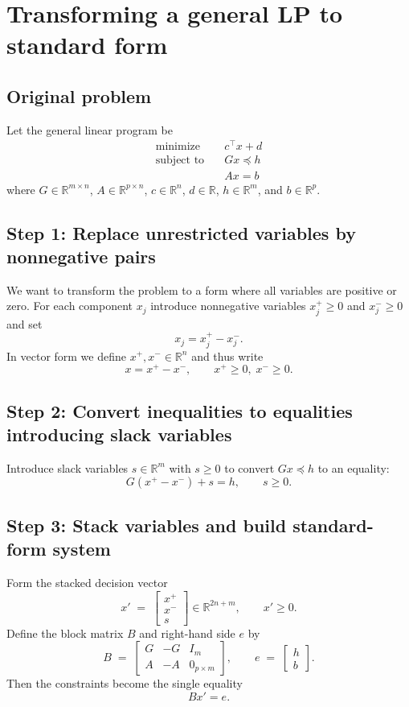 \documentclass[11pt]{article}
\begin{document}
\section*{Transforming a general LP to standard form}

\subsection*{Original problem}

Let the general linear program be
\begin{align*}
    \text{minimize}\quad   & c^\top x + d  \\
    \text{subject to}\quad & Gx \preceq h \\
                           & Ax = b
\end{align*}
where \(G\in\mathbb{R}^{m\times n}\), \(A\in\mathbb{R}^{p\times n}\), \(c\in\mathbb{R}^n\), \(d\in\mathbb{R}\), \(h\in\mathbb{R}^m\), and \(b\in\mathbb{R}^p\).

\subsection*{Step 1: Replace unrestricted variables by nonnegative pairs}

We want to transform the problem to a form where all variables are positive or zero.
For each component \(x_j\) introduce nonnegative variables \(x_j^+\ge 0\) and \(x_j^-\ge 0\) and set
\[
    x_j = x_j^+ - x_j^-.
\]
In vector form we define \(x^+,x^-\in\mathbb{R}^n\) and thus write
\[
    x = x^+ - x^- ,\qquad x^+\ge0,\;x^-\ge0.
\]

\subsection*{Step 2: Convert inequalities to equalities introducing slack variables}
Introduce slack variables \(s\in\mathbb{R}^m\) with \(s\ge0\) to convert \(Gx\preceq h\) to an equality:
\[
    G(x^+ - x^-) + s = h,\qquad s\ge0.
\]

\subsection*{Step 3: Stack variables and build standard-form system}
Form the stacked decision vector
\[
    x' \;=\; \begin{bmatrix} x^+ \\ x^- \\ s \end{bmatrix}
    \in\mathbb{R}^{2n+m},\qquad x'\ge0.
\]
Define the block matrix \(B\) and right-hand side \(e\) by
\[
    B \;=\; \begin{bmatrix}
        G & -G & I_m           \\[4pt]
        A & -A & 0_{p\times m}
    \end{bmatrix},
    \qquad
    e \;=\; \begin{bmatrix} h\\[4pt] b \end{bmatrix}.
\]
Then the constraints become the single equality
\[
    B x' = e.
\]
\end{document}
